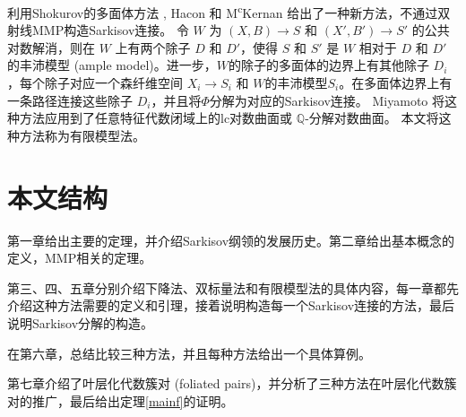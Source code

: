 利用Shokurov的多面体方法 \cite{Sho96,cs11}, Hacon 和 M\textsuperscript{c}Kernan \cite{haconSarkisovProgram2012}给出了一种新方法，不通过双射线MMP构造Sarkisov连接。
令 $W$ 为 $(X,B)\to S$ 和 $(X',B')\to S'$ 的公共对数解消，则在 $W$ 上有两个除子 $D$ 和 $D'$，使得 $S$ 和 $S'$ 是 $W$ 相对于 $D$ 和 $D'$的丰沛模型 (ample model)。进一步，$W$的除子的多面体的边界上有其他除子 $D_{i}$，每个除子对应一个森纤维空间 $X_{i}\to S_{i}$ 和 $W$的丰沛模型$S_{i}$。在多面体边界上有一条路径连接这些除子 $D_{i}$，并且将$\Phi$分解为对应的Sarkisov连接。
Miyamoto \cite{miyamoto2019TheSP} 将这种方法应用到了任意特征代数闭域上的lc对数曲面或 $\mathbb{Q}$-分解对数曲面。 本文将这种方法称为有限模型法。

\section{本文结构}
第一章给出主要的定理，并介绍Sarkisov纲领的发展历史。第二章给出基本概念的定义，MMP相关的定理。

第三、四、五章分别介绍下降法、双标量法和有限模型法的具体内容，每一章都先介绍这种方法需要的定义和引理，接着说明构造每一个Sarkisov连接的方法，最后说明Sarkisov分解的构造。

在第六章，总结比较三种方法，并且每种方法给出一个具体算例。

第七章介绍了叶层化代数簇对 (foliated pairs)，并分析了三种方法在叶层化代数簇对的推广，最后给出定理\ref{mainf}的证明。
